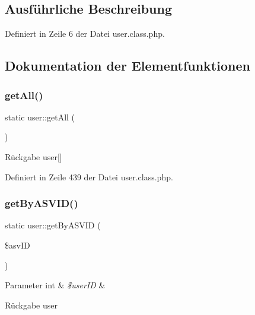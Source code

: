 \subsection{Ausführliche Beschreibung}


Definiert in Zeile 6 der Datei user.\+class.\+php.



\subsection{Dokumentation der Elementfunktionen}
\mbox{\label{classuser_a1c7b8b5395343487460b5a30b2c45b4b}} 
\subsubsection{\texorpdfstring{get\+All()}{getAll()}}
{\footnotesize\ttfamily static user\+::get\+All (\begin{DoxyParamCaption}{ }\end{DoxyParamCaption})\hspace{0.3cm}{\ttfamily [static]}}

\begin{DoxyReturn}{Rückgabe}
user\mbox{[}\mbox{]} 
\end{DoxyReturn}


Definiert in Zeile 439 der Datei user.\+class.\+php.

\mbox{\label{classuser_a56717ced4b7e218ab70605f14fc0edda}} 
\subsubsection{\texorpdfstring{get\+By\+A\+S\+V\+I\+D()}{getByASVID()}}
{\footnotesize\ttfamily static user\+::get\+By\+A\+S\+V\+ID (\begin{DoxyParamCaption}\item[{}]{\$asv\+ID }\end{DoxyParamCaption})\hspace{0.3cm}{\ttfamily [static]}}


\begin{DoxyParams}[1]{Parameter}
int & {\em \$user\+ID} & \\
\hline
\end{DoxyParams}
\begin{DoxyReturn}{Rückgabe}
user 
\end{DoxyReturn}


